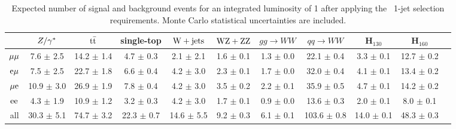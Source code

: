 \begin{table}[!ht]
  \begin{center}
 {\scriptsize
  \begin{tabular} {|c|c|c|c|c|c|c|c|c|c|c|}
\hline
  & $Z/\gamma^*$ & $\mathrm{t}\bar{\mathrm{t}}$ & single-top & $\mathrm{W+jets}$ & $\mathrm{W}\mathrm{Z}+\mathrm{Z}\mathrm{Z}$ & $gg \to WW$ & $qq \to WW$ & H$_{130}$ &   H$_{160}$ \\
  \hline
  \hline
  $\mu\mu$   &  7.6 $\pm$   2.5 & 14.2 $\pm$   1.4 &  4.7 $\pm$   0.3 &   2.1 $\pm$	2.1 &  1.6  $\pm$         0.1 &  1.3 $\pm$   0.0 &  22.1 $\pm$	0.4 &  3.3 $\pm$	0.1 & 12.7 $\pm$	0.2 \\
  $\mathrm{e}\mu$   &  7.5 $\pm$   2.5 & 22.7 $\pm$   1.8 &  6.6 $\pm$   0.4 &   4.2 $\pm$	3.0 &  2.3  $\pm$         0.1 &  1.7 $\pm$   0.0 &  32.0 $\pm$	0.4 &  4.1 $\pm$	0.1 & 13.4 $\pm$	0.2 \\
  $\mu\mathrm{e}$   & 10.9 $\pm$   3.0 & 26.9 $\pm$   1.9 &  7.8 $\pm$   0.4 &   4.2 $\pm$	3.0 &  3.5  $\pm$         0.2 &  2.2 $\pm$   0.1 &  35.9 $\pm$	0.5 &  4.7 $\pm$	0.1 & 14.2 $\pm$	0.2 \\
  $\mathrm{e}\mathrm{e}$   &  4.3 $\pm$   1.9 & 10.9 $\pm$   1.2 &  3.2 $\pm$   0.3 &   4.2 $\pm$	3.0 &  1.7  $\pm$         0.1 &  0.9 $\pm$   0.0 &  13.6 $\pm$	0.3 &  2.0 $\pm$	0.1 &  8.0 $\pm$	0.1 \\
  \hline
       all & 30.3 $\pm$   5.1 & 74.7 $\pm$   3.2 & 22.3 $\pm$   0.7 &  14.6 $\pm$	5.5 &  9.2  $\pm$         0.3 &  6.1 $\pm$   0.1 & 103.6 $\pm$	0.8 & 14.0 $\pm$	0.1 & 48.3 $\pm$	0.3 \\
 \hline
  \end{tabular}
  }
  \caption{Expected number of signal and background events for an 
  integrated luminosity of 1\ifb{} after applying the \ww\ 
  1-jet selection requirements. Monte Carlo statistical 
  uncertainties are included.}
   \label{tab:wwselection1}
  \end{center}
\end{table}
